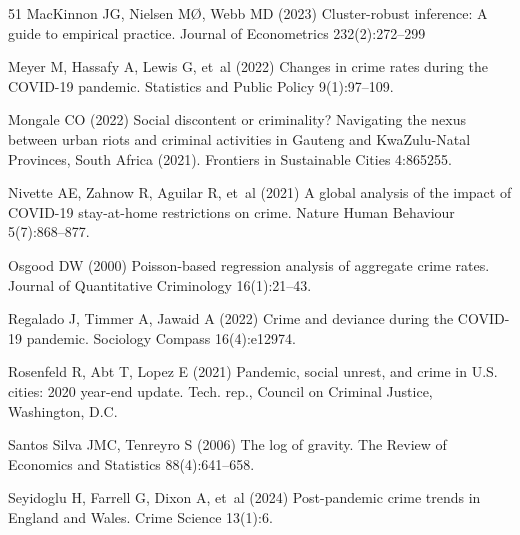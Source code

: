 \documentclass[pdflatex,sn-basic]{sn-jnl}
\begin{document}
\begin{thebibliography}{51}
MacKinnon JG, Nielsen M{\O}, Webb MD (2023) Cluster-robust inference: {A} guide
  to empirical practice. Journal of Econometrics 232(2):272--299

Meyer M, Hassafy A, Lewis G, et~al (2022) Changes in crime rates during the
  {COVID-19} pandemic. Statistics and Public Policy 9(1):97--109.

Mongale CO (2022) Social discontent or criminality? {N}avigating the nexus
  between urban riots and criminal activities in {Gauteng} and {KwaZulu-Natal}
  {Provinces}, {South Africa} (2021). Frontiers in Sustainable Cities 4:865255.

Nivette AE, Zahnow R, Aguilar R, et~al (2021) A global analysis of the impact
  of {COVID-19} stay-at-home restrictions on crime. Nature Human Behaviour
  5(7):868--877. 

Osgood DW (2000) Poisson-based regression analysis of aggregate crime rates.
  Journal of Quantitative Criminology 16(1):21--43.

Regalado J, Timmer A, Jawaid A (2022) Crime and deviance during the {COVID-19}
  pandemic. Sociology Compass 16(4):e12974. 

Rosenfeld R, Abt T, Lopez E (2021) Pandemic, social unrest, and crime in {U.S.}
  cities: 2020 year-end update. Tech. rep., Council on Criminal Justice,
  Washington, D.C.

{Santos Silva} JMC, Tenreyro S (2006) The log of gravity. The Review of
  Economics and Statistics 88(4):641--658. 

Seyidoglu H, Farrell G, Dixon A, et~al (2024) Post-pandemic crime trends in
  {England} and {Wales}. Crime Science 13(1):6.


\end{thebibliography}
\end{document}
